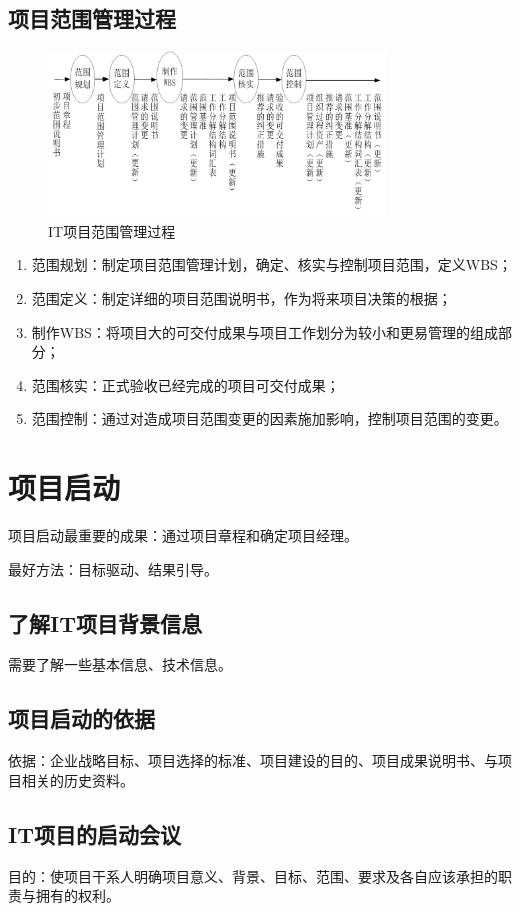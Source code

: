 \subsection{项目范围管理过程}
\begin{figure}[!h]
	\centering
	\includegraphics[width=0.8\textwidth]{image/4-1}
	\caption{IT项目范围管理过程}
\end{figure}
\begin{enumerate}
	\item 范围规划：制定项目范围管理计划，确定、核实与控制项目范围，定义WBS；
	\item 范围定义：制定详细的项目范围说明书，作为将来项目决策的根据；
	\item 制作WBS：将项目大的可交付成果与项目工作划分为较小和更易管理的组成部分；
	\item 范围核实：正式验收已经完成的项目可交付成果；
	\item 范围控制：通过对造成项目范围变更的因素施加影响，控制项目范围的变更。
\end{enumerate}
\section{项目启动}
项目启动最重要的成果：通过项目章程和确定项目经理。
\par 最好方法：目标驱动、结果引导。
\subsection{了解IT项目背景信息}
需要了解一些基本信息、技术信息。
\subsection{项目启动的依据}
依据：企业战略目标、项目选择的标准、项目建设的目的、项目成果说明书、与项目相关的历史资料。
\subsection{IT项目的启动会议}
目的：使项目干系人明确项目意义、背景、目标、范围、要求及各自应该承担的职责与拥有的权利。
